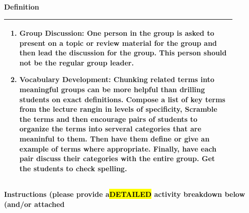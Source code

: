\documentclass{article}
\begin{document}
{\large\textbf{Definition}}\\
\noindent
\begin{tabular}{|p{0.9\linewidth}|}
\hline
\begin{enumerate}
    \item\textbf{Group Discussion:} One person in the group is asked to present on a topic or review material for the group and then lead the discussion for the group. This person should not be the regular group leader.
    \item\textbf{Vocabulary Development:} Chunking related terms into meaningful groups can be more helpful than drilling students on exact definitions. Compose a list of key terms from the lecture rangin in levels of specificity, Scramble the terms and then encourage pairs of students to organize the terms into serveral categories that are meaninful to them. Then have them define or give an example of terms where appropriate. Finally, have each pair discuss their categories with the entire group. Get the students to check spelling.
 
\end{enumerate}\\
\hline
\end{tabular}
\vspace{0.2cm}
\newpage
{\large\textbf{Instructions (please provide a\hl{DETAILED} activity breakdown below (and/or attached}}\\
\noindent
\end{document}
